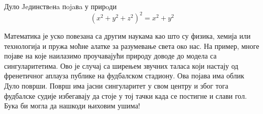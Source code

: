 \begin{surferPage}{Дуло}
Jeдинствeнa пojaвa у прирoди  \\
\smallskip
\[(x^2+ y^2+ z^2)^2	= x^2+ y^2\]

\singlespacing
Математика је уско повезана са другим наукама као што су  физика, хемија или технологија и пружа моћне алатке за разумевање света око нас. 
\singlespacing
На пример, многе појаве на које наилазимо проучавајући природу доводе до модела са сингуларитетима.
\singlespacing
Ово је случај са ширењем звучних таласа који настају од френетичног аплауза публике на фудбалском стадиону. Ова појава има облик Дуло површи. Површ има јасни сингуларитет у свом центру и због тога фудбалске судије избегавају да стоје у тој тачки када се постигне и слави гол. Бука би могла да нашкоди њиховим ушима!
\end{surferPage}
